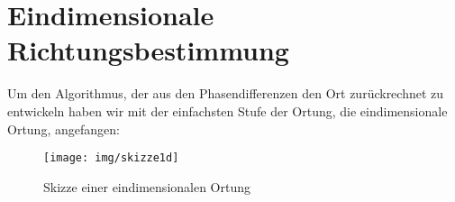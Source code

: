   \section{Eindimensionale Richtungsbestimmung} 
  Um den Algorithmus, der aus den Phasendifferenzen den Ort zurückrechnet zu entwickeln haben wir mit der
einfachsten Stufe der Ortung, die eindimensionale Ortung, angefangen:
    \begin{figure}
        \centering
        \texttt{[image: img/skizze1d]}
        \caption{Skizze einer eindimensionalen Ortung}
    \end{figure}
